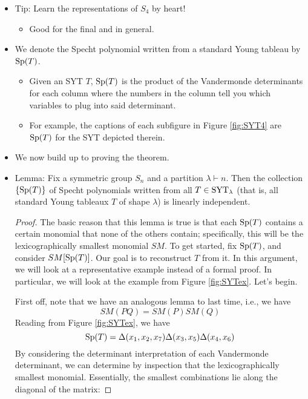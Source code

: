 \documentclass[../notes.tex]{subfiles}
\begin{document}
\begin{itemize}
\begin{enumerate}
    \end{enumerate}
    \item Tip: Learn the representations of $S_4$ by heart!
    \begin{itemize}
        \item Good for the final and in general.
    \end{itemize}
    \item We denote the Specht polynomial written from a standard Young tableau by $\operatorname{Sp}(T)$.
    \begin{itemize}
        \item Given an SYT $T$, $\operatorname{Sp}(T)$ is the product of the Vandermonde determinants for each column where the numbers in the column tell you which variables to plug into said determinant.
        \item For example, the captions of each subfigure in Figure \ref{fig:SYT4} are $\operatorname{Sp}(T)$ for the SYT depicted therein.
    \end{itemize}
    \item We now build up to proving the theorem.
    \item Lemma: Fix a symmetric group $S_n$ and a partition $\lambda\vdash n$. Then the collection $\{\operatorname{Sp}(T)\}$ of Specht polynomials written from all $T\in\operatorname{SYT}_\lambda$ (that is, all standard Young tableaux $T$ of shape $\lambda$) is linearly independent.
    \begin{proof}
        The basic reason that this lemma is true is that each $\operatorname{Sp}(T)$ contains a certain monomial that none of the others contain; specifically, this will be the lexicographically smallest monomial $SM$. To get started, fix $\operatorname{Sp}(T)$, and consider $SM[\operatorname{Sp}(T)]$. Our goal is to reconstruct $T$ from it. In this argument, we will look at a representative example instead of a formal proof. In particular, we will look at the example from Figure \ref{fig:SYTex}. Let's begin.\par
        First off, note that we have an analogous lemma to last time, i.e., we have
        \begin{equation*}
            SM(PQ) = SM(P)SM(Q)
        \end{equation*}
        Reading from Figure \ref{fig:SYTex}, we have
        \begin{equation*}
            \operatorname{Sp}(T) = \Delta(x_1,x_2,x_7)\Delta(x_3,x_5)\Delta(x_4,x_6)
        \end{equation*}
        By considering the determinant interpretation of each Vandermonde determinant, we can determine by inspection that the lexicographically smallest monomial. Essentially, the smallest combinations lie along the diagonal of the matrix:

\end{proof}
\end{itemize}
\end{document}
